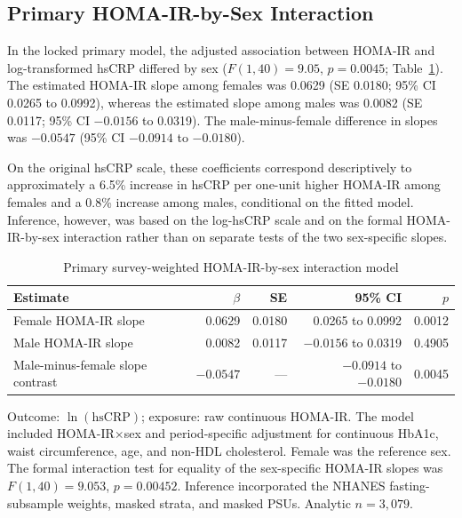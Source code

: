 \documentclass[11pt]{article}
\begin{document}
\subsection{Primary HOMA-IR-by-Sex Interaction}

In the locked primary model, the adjusted association between HOMA-IR and
log-transformed hsCRP differed by sex
($F(1,40)=9.05$, $p=0.0045$; Table~\ref{tab:primary_sex_interaction}). The estimated HOMA-IR slope among
females was 0.0629 (SE 0.0180; 95\% CI 0.0265 to 0.0992), whereas the
estimated slope among males was 0.0082 (SE 0.0117; 95\% CI $-0.0156$ to
0.0319). The male-minus-female difference in slopes was $-0.0547$
(95\% CI $-0.0914$ to $-0.0180$).

On the original hsCRP scale, these coefficients correspond descriptively to
approximately a 6.5\% increase in hsCRP per one-unit higher HOMA-IR among
females and a 0.8\% increase among males, conditional on the fitted model.
Inference, however, was based on the log-hsCRP scale and on the formal
HOMA-IR-by-sex interaction rather than on separate tests of the two
sex-specific slopes.

\begin{table}[htbp]
\centering
\caption{Primary survey-weighted HOMA-IR-by-sex interaction model}
\label{tab:primary_sex_interaction}
\begin{threeparttable}
\begin{tabular}{lrrrr}
\toprule
Estimate & $\beta$ & SE & 95\% CI & $p$ \\
\midrule
Female HOMA-IR slope & 0.0629 & 0.0180 & 0.0265 to 0.0992 & 0.0012 \\
Male HOMA-IR slope & 0.0082 & 0.0117 & $-0.0156$ to 0.0319 & 0.4905 \\
Male-minus-female slope contrast & $-0.0547$ & --- & $-0.0914$ to $-0.0180$ & 0.0045 \\
\bottomrule
\end{tabular}
\begin{tablenotes}[flushleft]
\footnotesize
\item Outcome: $\ln(\mathrm{hsCRP})$; exposure: raw continuous HOMA-IR.
The model included HOMA-IR$\times$sex and period-specific adjustment for
continuous HbA1c, waist circumference, age, and non-HDL cholesterol.
Female was the reference sex. The formal interaction test for equality of the
sex-specific HOMA-IR slopes was $F(1,40)=9.053$, $p=0.00452$.
Inference incorporated the NHANES fasting-subsample weights, masked strata,
and masked PSUs. Analytic $n=3,079$.
\end{tablenotes}
\end{threeparttable}
\end{table}
\end{document}

